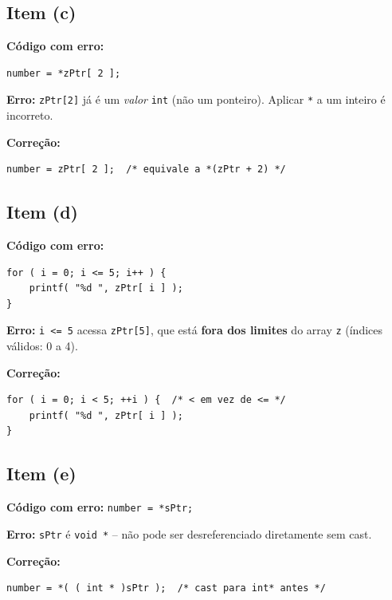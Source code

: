 \documentclass[12pt,a4paper]{article}
\begin{document}
\subsection*{Item (c)}
\begin{respostabox}
\textbf{Código com erro:}
\begin{lstlisting}
number = *zPtr[ 2 ];
\end{lstlisting}

\textbf{Erro:} \texttt{zPtr[2]} já é um \textit{valor} \texttt{int} (não um ponteiro).
Aplicar \texttt{*} a um inteiro é incorreto.

\textbf{Correção:}
\begin{lstlisting}
number = zPtr[ 2 ];  /* equivale a *(zPtr + 2) */
\end{lstlisting}
\end{respostabox}

\subsection*{Item (d)}
\begin{respostabox}
\textbf{Código com erro:}
\begin{lstlisting}
for ( i = 0; i <= 5; i++ ) {
    printf( "%d ", zPtr[ i ] );
}
\end{lstlisting}

\textbf{Erro:} \texttt{i <= 5} acessa \texttt{zPtr[5]}, que está \textbf{fora dos
limites} do array \texttt{z} (índices válidos: 0 a 4).

\textbf{Correção:}
\begin{lstlisting}
for ( i = 0; i < 5; ++i ) {  /* < em vez de <= */
    printf( "%d ", zPtr[ i ] );
}
\end{lstlisting}
\end{respostabox}

\subsection*{Item (e)}
\begin{respostabox}
\textbf{Código com erro:} \texttt{number = *sPtr;}

\textbf{Erro:} \texttt{sPtr} é \texttt{void *} -- não pode ser desreferenciado
diretamente sem cast.

\textbf{Correção:}
\begin{lstlisting}
number = *( ( int * )sPtr );  /* cast para int* antes */
\end{lstlisting}
\end{respostabox}
\end{document}
